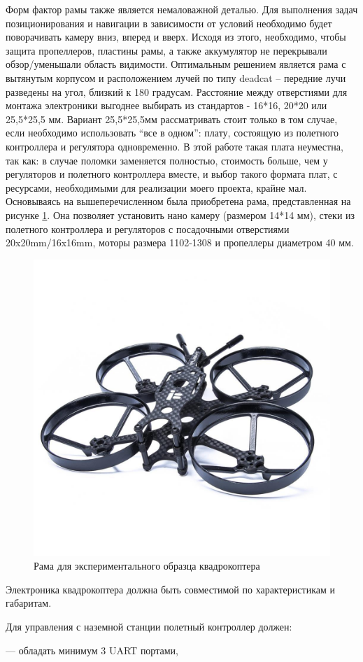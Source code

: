 Форм фактор рамы также является немаловажной деталью. Для выполнения задач позиционирования и навигации в зависимости от условий необходимо будет поворачивать камеру вниз, вперед и вверх. Исходя из этого, необходимо, чтобы защита пропеллеров, пластины рамы, а также аккумулятор не перекрывали обзор/уменьшали область видимости. Оптимальным решением является рама с вытянутым корпусом и расположением лучей по типу deadcat – передние лучи разведены на угол, близкий к 180 градусам. Расстояние между отверстиями для монтажа электроники выгоднее выбирать из стандартов - 16*16, 20*20 или 25,5*25,5 мм. Вариант 25,5*25,5мм рассматривать стоит только в том случае, если необходимо использовать “все в одном”: плату, состоящую из полетного контроллера и регулятора одновременно. В этой работе такая плата неуместна, так как: в случае поломки заменяется полностью, стоимость больше, чем у регуляторов и полетного контроллера вместе, и выбор такого формата плат, с ресурсами, необходимыми для реализации моего проекта, крайне мал. Основываясь на вышеперечисленном была приобретена рама, представленная на рисунке \ref{fig:frame}. Она позволяет установить нано камеру (размером 14*14 мм), стеки из полетного контроллера и регуляторов с посадочными отверстиями 20x20mm/16x16mm, моторы размера 1102-1308 и пропеллеры диаметром 40 мм.

\begin{figure}[H]
	\centering
	\includegraphics[width=0.5\linewidth]{pics/frame}
	\caption{Рама для экспериментального образца квадрокоптера
	}
	\label{fig:frame} %
\end{figure}

Электроника квадрокоптера должна быть совместимой по характеристикам и габаритам. 

Для управления с наземной станции полетный контроллер должен:

--- обладать минимум 3 UART портами,

